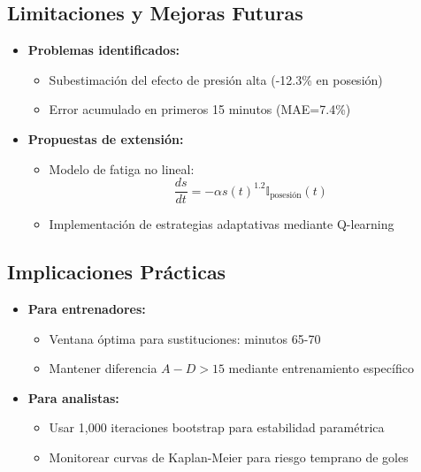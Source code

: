 \documentclass{article}
\begin{document}
\subsection{Limitaciones y Mejoras Futuras}
\begin{itemize}
    \item \textbf{Problemas identificados:}
    \begin{itemize}
        \item Subestimación del efecto de presión alta (-12.3\% en posesión)
        \item Error acumulado en primeros 15 minutos (MAE=7.4\%)
    \end{itemize}
    
    \item \textbf{Propuestas de extensión:}
    \begin{itemize}
        \item Modelo de fatiga no lineal: 
        \[
        \frac{ds}{dt} = -\alpha s(t)^{1.2} \mathbb{I}_{\text{posesión}}(t)
        \]
        \item Implementación de estrategias adaptativas mediante Q-learning
    \end{itemize}
\end{itemize}

\subsection{Implicaciones Prácticas}
\begin{itemize}
    \item \textbf{Para entrenadores:}
    \begin{itemize}
        \item Ventana óptima para sustituciones: minutos 65-70
        \item Mantener diferencia $A-D>15$ mediante entrenamiento específico
    \end{itemize}
    
    \item \textbf{Para analistas:}
    \begin{itemize}
        \item Usar 1,000 iteraciones bootstrap para estabilidad paramétrica
        \item Monitorear curvas de Kaplan-Meier para riesgo temprano de goles
    \end{itemize}
\end{itemize}
\end{document}

